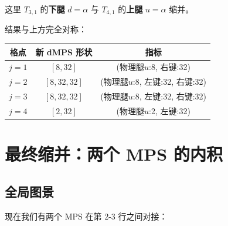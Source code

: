 \documentclass[12pt,a4paper]{article}
\begin{document}
这里 $T_{3,1}$ 的\textbf{下腿} $d=\alpha$ 与 $T_{4,1}$ 的\textbf{上腿} $u=\alpha$ 缩并。

结果与上方完全对称：

\begin{center}
\begin{tabular}{ccc}
\toprule
\textbf{格点} & \textbf{新 dMPS 形状} & \textbf{指标} \\
\midrule
$j=1$ & $[8, 32]$ & (物理腿$u$:8, 右键:32) \\
$j=2$ & $[8, 32, 32]$ & (物理腿$u$:8, 左键:32, 右键:32) \\
$j=3$ & $[8, 32, 32]$ & (物理腿$u$:8, 左键:32, 右键:32) \\
$j=4$ & $[2, 32]$ & (物理腿$u$:2, 左键:32) \\
\bottomrule
\end{tabular}
\end{center}


\section{最终缩并：两个 MPS 的内积}

\subsection{全局图景}

现在我们有两个 MPS 在第 2-3 行之间对接：
\end{document}
